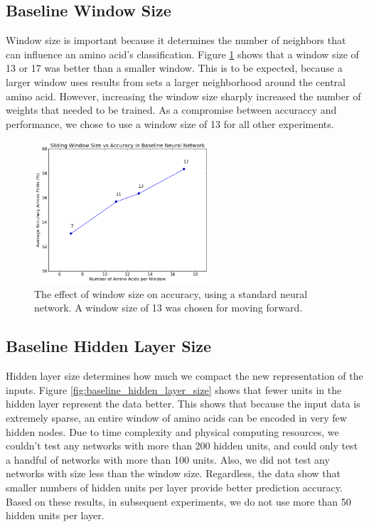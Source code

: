 \documentclass[letterpaper,twocolumn,12pt]{article}
\begin{document}
\subsection{Baseline Window Size}
Window size is important because it determines the number of neighbors that can influence an amino acid's classification.
Figure \ref{fig:baseline_window_size} shows that a window size of 13 or 17 was better than a smaller window.
This is to be expected, because a larger window uses results from sets a larger neighborhood around the central amino acid.
However, increasing the window size sharply increased the number of weights that needed to be trained.
As a compromise between accuraccy and performance, we chose to use a window size of 13 for all other experiments.

\begin{figure}[ht!]
\centering
\includegraphics[width=65mm]{results/baseline/baseline_windowSize.png}
\caption{The effect of window size on accuracy, using a standard neural network. A window size of 13 was chosen for moving forward.}
\label{fig:baseline_window_size}
\end{figure}

\subsection{Baseline Hidden Layer Size}
Hidden layer size determines how much we compact the new representation of the inputs.
Figure \ref{fig:baseline_hidden_layer_size} shows that fewer units in the hidden layer represent the data better.
This shows that because the input data is extremely sparse, an entire window of amino acids can be encoded in very few hidden nodes.
Due to time complexity and physical computing resources, we couldn't test any networks with more than 200 hidden units, and could only test a handful of networks with more than 100 units.
Also, we did not test any networks with size less than the window size.
Regardless, the data show that smaller numbers of hidden units per layer provide better prediction accuracy.
Based on these results, in subsequent experiments, we do not use more than 50 hidden units per layer.
\end{document}
